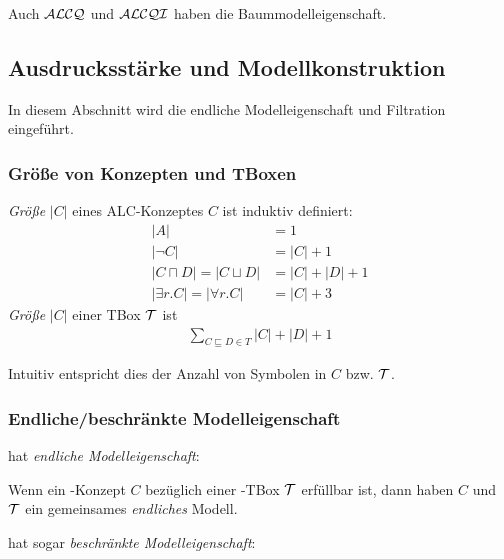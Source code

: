 Auch $\mathcal{A}\mathcal{L}\mathcal{C}\mathcal{Q}$ und $\mathcal{A}\mathcal{L}\mathcal{C}\mathcal{Q}\mathcal{I}$ haben die Baummodelleigenschaft.

\subsection{Ausdrucksstärke und
Modellkonstruktion}\label{ausdrucksstuxe4rke-und-modellkonstruktion}

In diesem Abschnitt  wird die endliche Modelleigenschaft und Filtration eingeführt.

\subsubsection{Größe von Konzepten und
TBoxen}\label{gruxf6uxdfe-von-konzepten-und-tboxen}

\begin{definition}[Größe]
\emph{Größe} $\left| C \right|$ eines ALC-Konzeptes $C$ ist induktiv
definiert:
\begin{align*}
    \left| A \right| &= 1\\
    \left| \neg C \right| &= \left| C \right| + 1\\
    \left| C \sqcap D \right| = \left| C \sqcup D \right| &= \left| C \right| + \left| D \right| + 1\\
    \left| \exists r.C \right| = \left| \forall r.C \right| &= \left| C \right| + 3
\end{align*}
\emph{Größe} $\left| C \right|$ einer TBox $\mathcal{T}$ ist
\begin{align*}
  \sum_{C \sqsubseteq D \in T} \left| C \right| + \left| D \right| + 1
\end{align*}
\end{definition}

Intuitiv entspricht dies der Anzahl von Symbolen in $C$ bzw. $\mathcal{T}$.

\subsubsection{Endliche/beschränkte Modelleigenschaft}

\ALC hat \emph{endliche Modelleigenschaft}:

\begin{theorem}
Wenn ein \ALC-Konzept $C$ bezüglich einer \ALC-TBox $\mathcal{T}$ erfüllbar ist, dann haben $C$ und $\mathcal{T}$ ein gemeinsames \emph{endliches} Modell.
\end{theorem}

\ALC hat sogar \emph{beschränkte Modelleigenschaft}:


